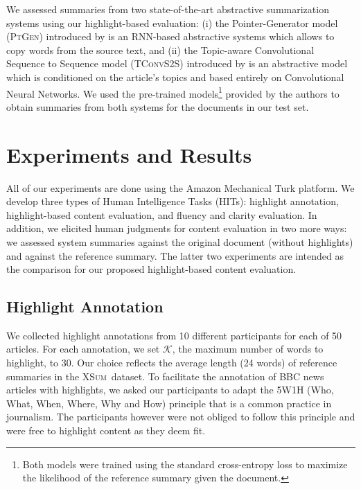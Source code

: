 \documentclass[11pt,a4paper]{article}
\newcommand\highres{\textsc{HighRES}}
\newcommand\ptgen{\textsc{PtGen}}
\newcommand\tconv{\textsc{TConvS2S}}
\newcommand\xsum{\textsc{XSum}}
\begin{document}

We assessed summaries from two state-of-the-art abstractive summarization systems using our highlight-based evaluation: (i) the Pointer-Generator model (\ptgen) introduced by \citet{See2017} is an RNN-based abstractive systems which allows to copy words from the source text, and (ii) the Topic-aware Convolutional Sequence to Sequence model (\tconv) introduced by \citet{narayan18xsum} is an   abstractive model which is conditioned on the article's topics and based entirely on Convolutional Neural Networks.
We used the pre-trained models\footnote{Both models were trained using the standard cross-entropy loss to maximize the likelihood of the reference summary given the document.} provided by the authors to obtain summaries from both systems for the documents in our test set.


\section{Experiments and Results}
\label{sec:exp-res}

All of our experiments are done using the Amazon Mechanical Turk platform. %
We develop three types of Human Intelligence Tasks (HITs): highlight annotation, highlight-based content evaluation, and fluency and clarity evaluation. In addition, we elicited human
judgments for content evaluation in two more ways: we assessed system summaries against the original document (without highlights) and against the reference summary. 
The latter two experiments are intended as the comparison for our proposed highlight-based content evaluation.

\subsection{Highlight Annotation} 

We collected highlight annotations from 10 different participants for each of 50 articles. For each annotation, we set  $\mathcal{K}$, the maximum number of words to highlight, to 30. Our choice reflects the average length (24 words) of reference summaries in the \xsum\ dataset. To facilitate the annotation of BBC news articles with highlights, we asked our participants to adapt the 5W1H (Who, What, When, Where, Why and How) principle \citep{Robertson1946} that is a common practice in journalism. The participants however were not obliged to follow this principle and were free to highlight content as they deem fit. 
\end{document}
